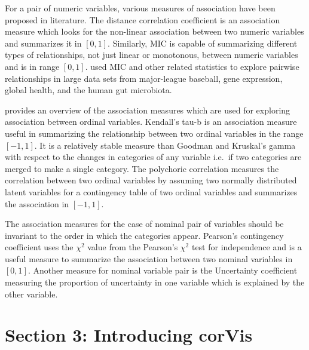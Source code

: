 For a pair of numeric variables, various measures of association have
been proposed in literature. The distance correlation coefficient
\citep{szekely2007measuring} is an association measure which looks for
the non-linear association between two numeric variables and summarizes
it in \([0,1]\). Similarly, MIC \citep{reshef2011detecting} is capable
of summarizing different types of relationships, not just linear or
monotonous, between numeric variables and is in range \([0,1]\).
\citet{reshef2011detecting} used MIC and other related statistics to
explore pairwise relationships in large data sets from major-league
baseball, gene expression, global health, and the human gut microbiota.

\citet{agresti2010analysis} provides an overview of the association
measures which are used for exploring association between ordinal
variables. Kendall's tau-b \citep{kendall1945treatment} is an
association measure useful in summarizing the relationship between two
ordinal variables in the range \([-1,1]\). It is a relatively stable
measure than Goodman and Kruskal's gamma with respect to the changes in
categories of any variable i.e.~if two categories are merged to make a
single category. The polychoric correlation \citep{olsson1979maximum}
measures the correlation between two ordinal variables by assuming two
normally distributed latent variables for a contingency table of two
ordinal variables and summarizes the association in \([-1,1]\).

The association measures for the case of nominal pair of variables
should be invariant to the order in which the categories appear.
Pearson's contingency coefficient uses the \({\chi}^2\) value from the
Pearson's \({\chi}^2\) test for independence and is a useful measure to
summarize the association between two nominal variables in \([0,1]\).
Another measure for nominal variable pair is the Uncertainty coefficient
\citep{theil1970estimation} measuring the proportion of uncertainty in
one variable which is explained by the other variable.

\hypertarget{section-3-introducing-corvis}{%
\section{Section 3: Introducing
corVis}\label{section-3-introducing-corvis}}

